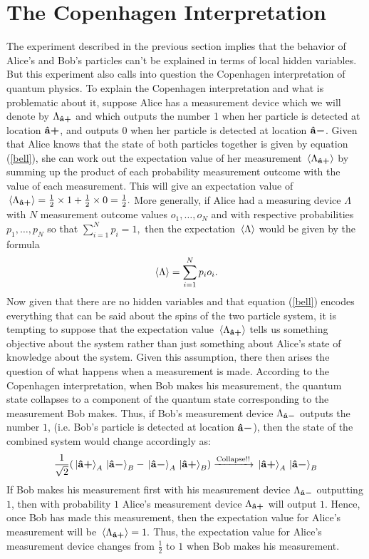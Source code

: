       \section{The Copenhagen Interpretation}
       The experiment described in the previous section implies that the behavior of Alice's and Bob's particles can't be explained in terms of local hidden variables. But this experiment also calls into question the Copenhagen interpretation of quantum physics. To explain the Copenhagen interpretation and what is problematic about it, suppose Alice has a measurement device which we will denote by $\Lambda_{\vb{\hat{{a}}}\bm{+}}$\label{Lambdaa} and which outputs the number 1 when her particle is detected at location $\vb{\hat{{a}}}\bm{+}$, and outputs 0 when her particle is detected at location $\vb{\hat{{a}}}\bm{-}$. Given that Alice knows that the state of both particles together is given by equation (\ref{bell}), she can work out the expectation value of her measurement $\ev*{\Lambda_{\uvbp{a}}}$ by summing up the product of each probability measurement outcome with the value of each measurement. This will give an expectation value of $\ev*{\Lambda_{\uvbp{a}}}=\frac{1}{2}\times 1 + \frac{1}{2}\times 0 = \frac{1}{2}.$ More generally, if Alice had a measuring device $\Lambda$ with $N$ measurement outcome values $o_1,\ldots,o_N$ and with respective probabilities $p_1,\ldots,p_N$ so that $\sum_{i=1}^N p_i=1,$ then the expectation $\ev*{\Lambda}$ would be given by the formula
      \begin{equation}\label{expectation}\ev*{\Lambda} =\sum_{i=1}^N p_io_i.
      \end{equation}
      Now given that there are no hidden variables and that equation (\ref{bell}) encodes everything that can be said about the spins of the two particle system, it is tempting to suppose that the expectation value $\ev*{\Lambda_{\uvbp{a}}}$ tells us something objective about the system rather than just something about Alice's state of knowledge about the system.  Given this assumption, there then arises the question of what happens when a measurement is made. According to the Copenhagen interpretation, when Bob makes his measurement, the quantum state collapses to a component of the quantum state corresponding to the measurement Bob makes. Thus, if Bob's measurement device $\Lambda_{\vb{\hat{{a}}}\bm{-}}$ outputs the number $1$, (i.e. Bob's particle is detected at location $\vb{\hat{{a}}}\bm{-}$), then the state of the combined system would change accordingly as:
      $$\frac{1}{\sqrt{2}}(\ket*{\vb{\hat{{a}}}\bm{+}}_A\ket*{\vb{\hat{{a}}}\bm{-}}_B-\ket*{\vb{\hat{{a}}}\bm{-}}_A\ket*{\vb{\hat{{a}}}\bm{+}}_B)\xrightarrow{\text{Collapse!!}}\ket*{\vb{\hat{{a}}}\bm{+}}_A\ket*{\vb{\hat{{a}}}\bm{-}}_B $$
      If Bob makes his measurement first with his measurement device $\Lambda_{\vb{\hat{{a}}}\bm{-}}$  outputting $1$, then with probability $1$ Alice's measurement device $\Lambda_{\vb{\hat{{a}}}\bm{+}}$ will output $1$. Hence, once Bob has made this measurement, then the expectation value for Alice's measurement will be $\ev*{\Lambda_{\uvbp{a}}}=1.$ Thus, the expectation value for Alice's measurement device changes from $\frac{1}{2}$ to $1$ when Bob makes his measurement.
       
